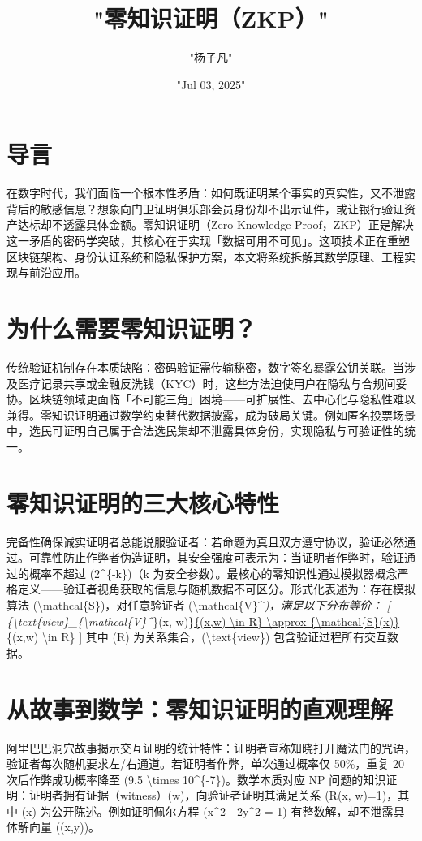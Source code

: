 \title{"零知识证明（ZKP）"}
\author{"杨子凡"}
\date{"Jul 03, 2025"}
\maketitle
\chapter{导言}
在数字时代，我们面临一个根本性矛盾：如何既证明某个事实的真实性，又不泄露背后的敏感信息？想象向门卫证明俱乐部会员身份却不出示证件，或让银行验证资产达标却不透露具体金额。零知识证明（Zero-Knowledge Proof，ZKP）正是解决这一矛盾的密码学突破，其核心在于实现「数据可用不可见」。这项技术正在重塑区块链架构、身份认证系统和隐私保护方案，本文将系统拆解其数学原理、工程实现与前沿应用。\par
\chapter{为什么需要零知识证明？}
传统验证机制存在本质缺陷：密码验证需传输秘密，数字签名暴露公钥关联。当涉及医疗记录共享或金融反洗钱（KYC）时，这些方法迫使用户在隐私与合规间妥协。区块链领域更面临「不可能三角」困境——可扩展性、去中心化与隐私性难以兼得。零知识证明通过数学约束替代数据披露，成为破局关键。例如匿名投票场景中，选民可证明自己属于合法选民集却不泄露具体身份，实现隐私与可验证性的统一。\par
\chapter{零知识证明的三大核心特性}
完备性确保诚实证明者总能说服验证者：若命题为真且双方遵守协议，验证必然通过。可靠性防止作弊者伪造证明，其安全强度可表示为：当证明者作弊时，验证通过的概率不超过 (2\^{}\{{}-k\}{})（k 为安全参数）。最核心的零知识性通过模拟器概念严格定义——验证者视角获取的信息与随机数据不可区分。形式化表述为：存在模拟算法 (\textbackslash{}mathcal\{{}S\}{})，对任意验证者 (\textbackslash{}mathcal\{{}V\}{}\^{}\textit{)，满足以下分布等价：
[
\{{}\textbackslash{}text\{{}view\}{}\_{}\{{}\textbackslash{}mathcal\{{}V\}{}\^{}}\}{}(x, w)\}{}\underline{\{{}(x,w) \textbackslash{}in R\}{} \textbackslash{}approx \{{}\textbackslash{}mathcal\{{}S\}{}(x)\}{}}\{{}(x,w) \textbackslash{}in R\}{}
]
其中 (R) 为关系集合，(\textbackslash{}text\{{}view\}{}) 包含验证过程所有交互数据。\par
\chapter{从故事到数学：零知识证明的直观理解}
阿里巴巴洞穴故事揭示交互证明的统计特性：证明者宣称知晓打开魔法门的咒语，验证者每次随机要求左/右通道。若证明者作弊，单次通过概率仅 50\%{}，重复 20 次后作弊成功概率降至 (9.5 \textbackslash{}times 10\^{}\{{}-7\}{})。数学本质对应 NP 问题的知识证明：证明者拥有证据（witness）(w)，向验证者证明其满足关系 (R(x, w)=1)，其中 (x) 为公开陈述。例如证明佩尔方程 (x\^{}2 - 2y\^{}2 = 1) 有整数解，却不泄露具体解向量 ((x,y))。\par
